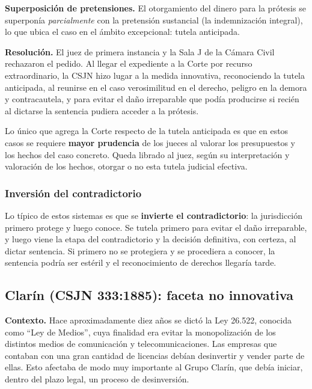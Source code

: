 \documentclass[12pt,oneside]{book}
\begin{document}
\textbf{Superposición de pretensiones.} El otorgamiento del dinero para la prótesis se superponía \emph{parcialmente} con la pretensión sustancial (la indemnización integral), lo que ubica el caso en el ámbito excepcional: tutela anticipada.

\textbf{Resolución.} El juez de primera instancia y la Sala J de la Cámara Civil rechazaron el pedido. Al llegar el expediente a la Corte por recurso extraordinario, la CSJN hizo lugar a la medida innovativa, reconociendo la tutela anticipada, al reunirse en el caso verosimilitud en el derecho, peligro en la demora y contracautela, y para evitar el daño irreparable que podía producirse si recién al dictarse la sentencia pudiera acceder a la prótesis.

\begin{important}
Lo único que agrega la Corte respecto de la tutela anticipada es que en estos casos se requiere \textbf{mayor prudencia} de los jueces al valorar los presupuestos y los hechos del caso concreto. Queda librado al juez, según su interpretación y valoración de los hechos, otorgar o no esta tutela judicial efectiva.
\end{important}

\subsubsection{Inversión del contradictorio}

Lo típico de estos sistemas es que se \textbf{invierte el contradictorio}: la jurisdicción primero protege y luego conoce. Se tutela primero para evitar el daño irreparable, y luego viene la etapa del contradictorio y la decisión definitiva, con certeza, al dictar sentencia. Si primero no se protegiera y se procediera a conocer, la sentencia podría ser estéril y el reconocimiento de derechos llegaría tarde.

\subsection{Clarín (CSJN 333:1885): faceta no innovativa}

\textbf{Contexto.} Hace aproximadamente diez años se dictó la Ley 26.522, conocida como ``Ley de Medios'', cuya finalidad era evitar la monopolización de los distintos medios de comunicación y telecomunicaciones. Las empresas que contaban con una gran cantidad de licencias debían desinvertir y vender parte de ellas. Esto afectaba de modo muy importante al Grupo Clarín, que debía iniciar, dentro del plazo legal, un proceso de desinversión.
\end{document}
